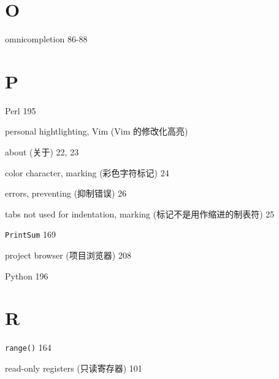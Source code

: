 \begin{multicols}{2}
\hangindent=3pc  \section*{O}

\hangindent=3pc  omnicompletion 86-88

\hangindent=3pc  \section*{P}

\hangindent=3pc  Perl 195

\hangindent=3pc  personal hightlighting, Vim (Vim 的修改化高亮) \par
\hangindent=3pc \quad about (关于) 22, 23 \par
\hangindent=3pc \quad color character, marking (彩色字符标记) 24 \par
\hangindent=3pc \quad errors, preventing (抑制错误) 26 \par
\hangindent=3pc \quad tabs not used for indentation, marking (标记不是用作缩进的制表符) 25 \par

\hangindent=3pc  \texttt{PrintSum} 169

\hangindent=3pc  project browser (项目浏览器) 208

\hangindent=3pc  Python 196

\hangindent=3pc  \section*{R}

\hangindent=3pc  \texttt{range()} 164

\hangindent=3pc  read-only registers (只读寄存器) 101


\end{multicols}
